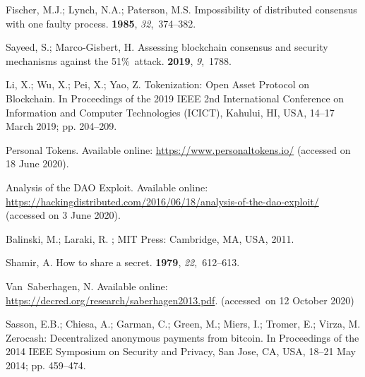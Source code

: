 \documentclass[applsci,article,accept,moreauthors,pdftex]{Definitions/mdpi}
\begin{document}
\begin{thebibliography}{999}
Fischer, M.J.; Lynch, N.A.; Paterson, M.S.
\newblock Impossibility of distributed consensus with one faulty process.
 {\bf 1985}, {\em 32},~374--382.

Sayeed, S.; Marco-Gisbert, H.
\newblock Assessing blockchain consensus and security mechanisms against the
  51\%~attack.
 {\bf 2019}, {\em 9},~1788.

Li, X.; Wu, X.; Pei, X.; Yao, Z.
\newblock Tokenization: Open Asset Protocol on Blockchain.
\newblock  In Proceedings of the 2019 IEEE 2nd International Conference on Information and Computer
  Technologies (ICICT),  {Kahului, HI, USA, 14--17 March 2019}; pp. 204--209.

Personal Tokens. Available online: 
\newblock \url{https://www.personaltokens.io/} 
\newblock (accessed on 18 June 2020).

Analysis of the DAO Exploit. Available online: 
  \url{https://hackingdistributed.com/2016/06/18/analysis-of-the-dao-exploit/}  (accessed on 3 June 2020).

Balinski, M.; Laraki, R.
; MIT Press:  {Cambridge, MA, USA,} %
  2011.

Shamir, A.
\newblock How to share a secret.
 {\bf 1979}, {\em 22},~612--613.

Van~Saberhagen, N.
Available online:  
  \url{https://decred.org/research/saberhagen2013.pdf}.
\newblock (accessed~on 12 October 2020)

Sasson, E.B.; Chiesa, A.; Garman, C.; Green, M.; Miers, I.; Tromer, E.; Virza,
  M.
\newblock Zerocash: Decentralized anonymous payments from bitcoin.
\newblock  In Proceedings of the 2014 IEEE Symposium on Security and Privacy,  San Jose, CA, USA, 18--21 May 2014; pp.
  459--474.


\end{thebibliography}
\end{document}
